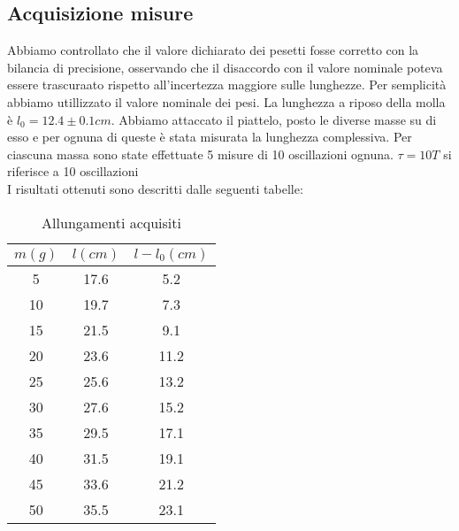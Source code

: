 \documentclass[a4paper,10pt]{article}
\begin{document}
\subsection{Acquisizione misure}
Abbiamo controllato che il valore dichiarato dei pesetti fosse corretto con la bilancia di precisione, osservando che il disaccordo con il valore nominale poteva essere trascuraato rispetto all'incertezza maggiore sulle lunghezze. Per semplicità abbiamo utillizzato il valore nominale dei pesi.
La lunghezza a riposo della molla è $l_0=12.4\pm0.1cm$.
Abbiamo attaccato il piattelo, posto le diverse masse su di esso e per ognuna di queste è stata misurata la lunghezza complessiva.
Per ciascuna massa sono state effettuate 5 misure di 10 oscillazioni ognuna. $\tau=10T$ si riferisce a 10 oscillazioni\\

I risultati ottenuti sono descritti dalle seguenti tabelle:
\begin{table}[H]
\centering
\caption{Allungamenti acquisiti}
\label{my-label}
\begin{tabular}{c|c|c}
$m(g)$ & \multicolumn{1}{l|}{$l(cm)$} & $l-l_0(cm)$ \\ \hline
5    & 17.6                          & 5.2        \\
10   & 19.7                          & 7.3        \\
15   & 21.5                          & 9.1        \\
20   & 23.6                         & 11.2       \\
25   & 25.6                         & 13.2       \\
30   & 27.6                         & 15.2       \\
35   & 29.5                         & 17.1       \\
40   & 31.5                         & 19.1       \\
45   & 33.6                         & 21.2       \\
50   & 35.5                         & 23.1      
\end{tabular}
\end{table}
\end{document}
